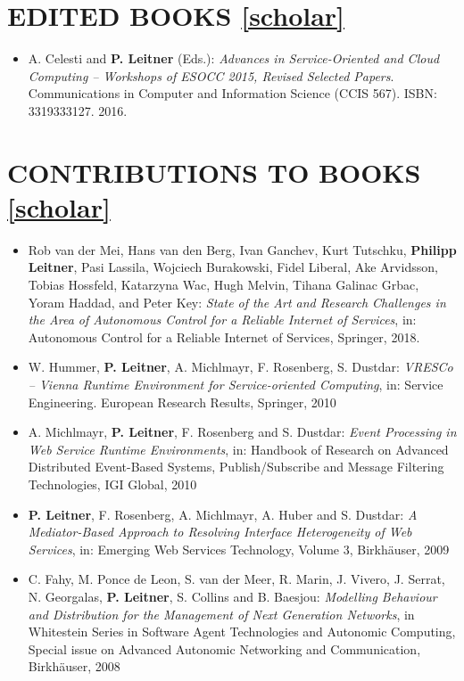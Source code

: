 \documentclass[paper=letter,fontsize=11pt]{scrartcl} %
\newcommand{\NewPart}[2]{\section*{\uppercase{#1} #2}}
\begin{document}
\NewPart{Edited Books}{\href{https://scholar.google.ch/citations?user=wZ9f8CAAAAAJ}{[scholar]}}

\begin{itemize}
	\item A. Celesti and \textbf{P. Leitner} (Eds.): \emph{Advances in
  Service-Oriented and Cloud Computing -- Workshops of ESOCC 2015, Revised Selected Papers}.
Communications in Computer and Information Science (CCIS 567). ISBN: 3319333127. 2016.

\end{itemize}

\NewPart{Contributions to Books}{\href{https://scholar.google.ch/citations?user=wZ9f8CAAAAAJ}{[scholar]}}

\begin{itemize}
	\item Rob van der Mei, Hans van den Berg, Ivan Ganchev, Kurt Tutschku, \textbf{Philipp Leitner}, Pasi Lassila, Wojciech Burakowski, Fidel Liberal, Ake Arvidsson, Tobias Hossfeld, Katarzyna Wac, Hugh Melvin, Tihana Galinac Grbac, Yoram Haddad, and Peter Key:
	\emph{State of the Art and Research Challenges in the Area of Autonomous Control for a Reliable Internet of Services},
	in: Autonomous Control for a Reliable Internet of Services, Springer, 2018.
\item W. Hummer, \textbf{P. Leitner}, A. Michlmayr, F. Rosenberg, S. Dustdar:
\emph{VRESCo -- Vienna Runtime Environment for Service-oriented Computing},
in: Service Engineering. European Research Results, Springer, 2010
\item A. Michlmayr, \textbf{P. Leitner}, F. Rosenberg and S. Dustdar: \emph{Event
Processing in Web Service Runtime Environments}, in: Handbook of
Research on Advanced Distributed Event-Based Systems, Publish/Subscribe and
Message Filtering Technologies, IGI Global, 2010
\item \textbf{P. Leitner}, F. Rosenberg, A. Michlmayr, A. Huber and S. Dustdar:
\emph{A Mediator-Based Approach to Resolving Interface Heterogeneity of Web
Services}, in: Emerging Web Services Technology, Volume 3,
Birkh\"auser, 2009
\item C. Fahy, M. Ponce de Leon, S. van der Meer, R. Marin, J. Vivero, J. Serrat,
N. Georgalas, \textbf{P. Leitner}, S. Collins and B. Baesjou: \emph{Modelling
Behaviour and Distribution for the Management of Next Generation Networks},
in Whitestein Series in Software Agent Technologies and Autonomic
Computing, Special issue on Advanced Autonomic Networking and Communication,
Birkh\"auser, 2008
\end{itemize}
\end{document}
